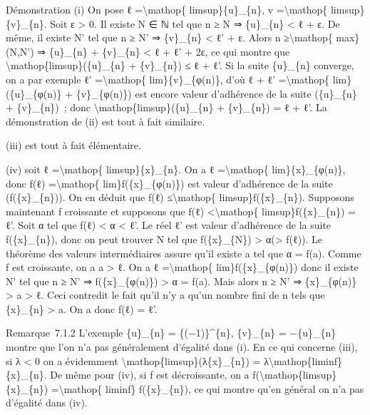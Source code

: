 \documentclass[]{article}
\begin{document}
Démonstration (i) On pose ℓ =\textbackslash{}mathop\{
limsup\}\{u\}\_\{n\}, v =\textbackslash{}mathop\{ limsup\}\{v\}\_\{n\}.
Soit ε \textgreater{} 0. Il existe N ∈ ℕ tel que n ≥ N ⇒ \{u\}\_\{n\}
\textless{} ℓ + ε. De même, il existe N' tel que n ≥ N' ⇒ \{v\}\_\{n\}
\textless{} ℓ' + ε. Alors n ≥\textbackslash{}mathop\{ max\}(N,N') ⇒
\{u\}\_\{n\} + \{v\}\_\{n\} \textless{} ℓ + ℓ' + 2ε, ce qui montre que
\textbackslash{}mathop\{limsup\}(\{u\}\_\{n\} + \{v\}\_\{n\}) ≤ ℓ + ℓ'.
Si la suite \{u\}\_\{n\} converge, on a par exemple ℓ'
=\textbackslash{}mathop\{ lim\}\{v\}\_\{φ(n)\}, d'où ℓ + ℓ'
=\textbackslash{}mathop\{ lim\}(\{u\}\_\{φ(n)\} + \{v\}\_\{φ(n)\}) est
encore valeur d'adhérence de la suite (\{u\}\_\{n\} + \{v\}\_\{n\})~;
donc \textbackslash{}mathop\{limsup\}(\{u\}\_\{n\} + \{v\}\_\{n\}) = ℓ +
ℓ'. La démonstration de (ii) est tout à fait similaire.

(iii) est tout à fait élémentaire.

(iv) soit ℓ =\textbackslash{}mathop\{ limsup\}\{x\}\_\{n\}. On a ℓ
=\textbackslash{}mathop\{ lim\}\{x\}\_\{φ(n)\}, donc f(ℓ)
=\textbackslash{}mathop\{ lim\}f(\{x\}\_\{φ(n)\}) est valeur d'adhérence
de la suite (f(\{x\}\_\{n\})). On en déduit que f(ℓ)
≤\textbackslash{}mathop\{ limsup\}f(\{x\}\_\{n\}). Supposons maintenant
f croissante et supposons que f(ℓ) \textless{}\textbackslash{}mathop\{
limsup\}f(\{x\}\_\{n\}) = ℓ'. Soit α tel que f(ℓ) \textless{} α
\textless{} ℓ'. Le réel ℓ' est valeur d'adhérence de la suite
f(\{x\}\_\{n\}), donc on peut trouver N tel que f(\{x\}\_\{N\})
\textgreater{} α(\textgreater{} f(ℓ)). Le théorème des valeurs
intermédiaires assure qu'il existe a tel que α = f(a). Comme f est
croissante, on a a \textgreater{} ℓ. On a ℓ =\textbackslash{}mathop\{
lim\}f(\{x\}\_\{φ(n)\}) donc il existe N' tel que n ≥ N' ⇒
f(\{x\}\_\{φ(n)\}) \textgreater{} α = f(a). Mais alors n ≥ N' ⇒
\{x\}\_\{φ(n)\} \textgreater{} a \textgreater{} ℓ. Ceci contredit le
fait qu'il n'y a qu'un nombre fini de n tels que \{x\}\_\{n\}
\textgreater{} a. On a donc f(ℓ) = ℓ'.

Remarque~7.1.2 L'exemple \{u\}\_\{n\} = \{(−1)\}\^{}\{n\}, \{v\}\_\{n\}
= −\{u\}\_\{n\} montre que l'on n'a pas généralement d'égalité dans (i).
En ce qui concerne (iii), si λ \textless{} 0 on a évidemment
\textbackslash{}mathop\{limsup\}(λ\{x\}\_\{n\}) =
λ\textbackslash{}mathop\{liminf\} \{x\}\_\{n\}. De même pour (iv), si f
est décroissante, on a f(\textbackslash{}mathop\{limsup\}\{x\}\_\{n\})
=\textbackslash{}mathop\{ liminf\} f(\{x\}\_\{n\}), ce qui montre qu'en
général on n'a pas d'égalité dans (iv).
\end{document}
